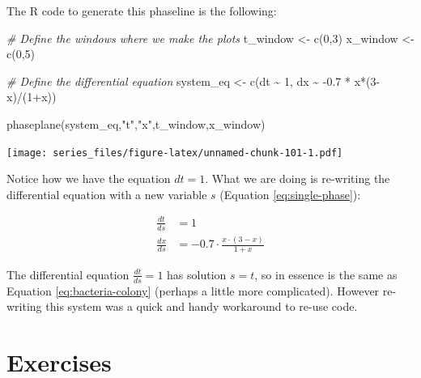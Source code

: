 \documentclass[
]{book}
\newenvironment{Shaded}{\begin{snugshade}}{\end{snugshade}}
\newcommand{\CommentTok}[1]{\textcolor[rgb]{0.56,0.35,0.01}{\textit{#1}}}
\newcommand{\DecValTok}[1]{\textcolor[rgb]{0.00,0.00,0.81}{#1}}
\newcommand{\FloatTok}[1]{\textcolor[rgb]{0.00,0.00,0.81}{#1}}
\newcommand{\FunctionTok}[1]{\textcolor[rgb]{0.00,0.00,0.00}{#1}}
\newcommand{\NormalTok}[1]{#1}
\newcommand{\OtherTok}[1]{\textcolor[rgb]{0.56,0.35,0.01}{#1}}
\newcommand{\SpecialCharTok}[1]{\textcolor[rgb]{0.00,0.00,0.00}{#1}}
\newcommand{\StringTok}[1]{\textcolor[rgb]{0.31,0.60,0.02}{#1}}
\theoremstyle{definition}
\theoremstyle{definition}
\theoremstyle{definition}
\theoremstyle{remark}
\begin{document}
The R code to generate this phaseline is the following:

\begin{Shaded}
\begin{Highlighting}[]
\CommentTok{\# Define the windows where we make the plots}
\NormalTok{t\_window }\OtherTok{\textless{}{-}} \FunctionTok{c}\NormalTok{(}\DecValTok{0}\NormalTok{,}\DecValTok{3}\NormalTok{)}
\NormalTok{x\_window }\OtherTok{\textless{}{-}} \FunctionTok{c}\NormalTok{(}\DecValTok{0}\NormalTok{,}\DecValTok{5}\NormalTok{)}

\CommentTok{\# Define the differential equation}
\NormalTok{system\_eq }\OtherTok{\textless{}{-}} \FunctionTok{c}\NormalTok{(dt }\SpecialCharTok{\textasciitilde{}} \DecValTok{1}\NormalTok{,}
\NormalTok{               dx }\SpecialCharTok{\textasciitilde{}} \SpecialCharTok{{-}}\FloatTok{0.7} \SpecialCharTok{*}\NormalTok{ x}\SpecialCharTok{*}\NormalTok{(}\DecValTok{3}\SpecialCharTok{{-}}\NormalTok{x)}\SpecialCharTok{/}\NormalTok{(}\DecValTok{1}\SpecialCharTok{+}\NormalTok{x))}

\FunctionTok{phaseplane}\NormalTok{(system\_eq,}\StringTok{"t"}\NormalTok{,}\StringTok{"x"}\NormalTok{,t\_window,x\_window)}
\end{Highlighting}
\end{Shaded}

\texttt{[image: series\_files/figure-latex/unnamed-chunk-101-1.pdf]}

Notice how we have the equation \(dt = 1\). What we are doing is re-writing the differential equation with a new variable \(s\) (Equation \eqref{eq:single-phase}):

\begin{equation}
\begin{split}\label{eq:single-phase}
\frac{dt}{ds} &= 1 \\
\frac{dx}{ds} &= - 0.7 \cdot \frac{x \cdot (3- x)}{1 + x}
\end{split}
\end{equation}

The differential equation \(\displaystyle \frac{dt}{ds} = 1\) has solution \(s=t\), so in essence is the same as Equation \eqref{eq:bacteria-colony} (perhaps a little more complicated). However re-writing this system was a quick and handy workaround to re-use code.

\hypertarget{exercises-5}{%
\section{Exercises}\label{exercises-5}}
\end{document}
